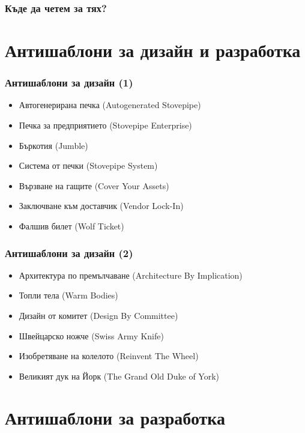 \documentclass[alsotrans]{beamerswitch}
\begin{document}
\begin{frame}
  \frametitle{Къде да четем за тях?}
  \nocite{*}
  
  
\end{frame}

\section{Антишаблони за дизайн и разработка}

\begin{frame}
  \frametitle{Антишаблони за дизайн (1)}

  \begin{itemize}[<+->]
  \item Автогенерирана печка (Autogenerated Stovepipe)
  \item Печка за предприятието (Stovepipe Enterprise)
  \item Бъркотия (Jumble)
  \item Система от печки (Stovepipe System)
  \item Вързване на гащите (Cover Your Assets)
  \item Заключване към доставчик (Vendor Lock-In)
  \item Фалшив билет (Wolf Ticket)
  \end{itemize}
\end{frame}

\begin{frame}
  \frametitle{Антишаблони за дизайн (2)}

  \begin{itemize}[<+->]
  \item Архитектура по премълчаване (Architecture By Implication)
  \item Топли тела (Warm Bodies)
  \item Дизайн от комитет (Design By Committee)
  \item Швейцарско ножче (Swiss Army Knife)
  \item Изобретяване на колелото (Reinvent The Wheel)
  \item Великият дук на Йорк (The Grand Old Duke of York)
  \end{itemize}
\end{frame}

\section{Антишаблони за разработка}
\end{document}
